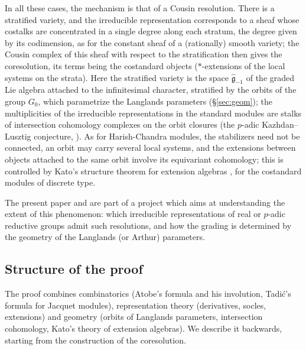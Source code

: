 \documentclass[a4paper,12pt,leqno]{amsart}
\theoremstyle{plain}
\theoremstyle{definition}
\begin{document}
In all these cases, the mechanism is that of a Cousin resolution. There is a stratified variety, and
the irreducible representation corresponds to a sheaf whose costalks are concentrated in a single
degree along each stratum, the degree given by its codimension, as for the constant sheaf of a
(rationally) smooth variety; the Cousin complex of this sheaf with respect to the stratification then
gives the coresolution, its terms being the costandard objects ($*$-extensions of the local systems on
the strata). Here the stratified variety is the space $\widehat{\mathfrak g}_{-1}$ of the graded Lie
algebra attached to the infinitesimal character, stratified by the orbits of the group $G_0$, which
parametrize the Langlands parameters (\S\ref{sec:geom}); the multiplicities of the irreducible
representations in the standard modules are stalks of intersection cohomology complexes on the orbit
closures (the $p$-adic Kazhdan--Lusztig conjecture, \cite{Sol25}). As for Harish-Chandra modules, the
stabilizers need not be connected, an orbit may carry several local systems, and the extensions
between objects attached to the same orbit involve its equivariant cohomology; this is controlled by
Kato's structure theorem for extension algebras \cite{Kat17}, for the costandard modules of discrete
type.

The present paper and \cite{Ren26} are part of a project which aims at understanding the extent
of this phenomenon: which irreducible representations of real or $p$-adic reductive groups admit such
resolutions, and how the grading is determined by the geometry of the Langlands (or Arthur)
parameters.


\subsection*{Structure of the proof}
The proof combines combinatorics (Atobe's formula and his involution, Tadi\'c's formula for Jacquet
modules), representation theory (derivatives, socles, extensions) and geometry (orbits of Langlands
parameters, intersection cohomology, Kato's theory of extension algebras). We describe it backwards,
starting from the construction of the coresolution.
\end{document}
